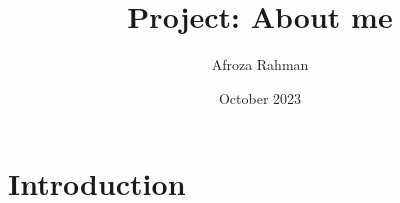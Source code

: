 \documentclass{article}
\title{Project: About me}
\author{Afroza Rahman}
\date{October 2023}
\begin{document}
\maketitle

\section{Introduction}
\end{document}
